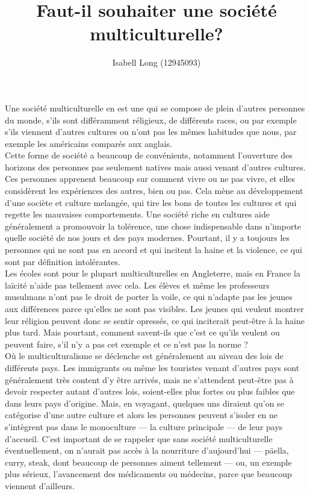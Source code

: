 \documentclass[12pt,a4paper]{article}
\begin{document}
\title{Faut-il souhaiter une société multiculturelle?}
\author{Isabell Long (12945093)}
\maketitle

Une société multiculturelle en est une qui se compose de plein
d'autres personnes du monde, s'ils sont différamment réligieux, de
différents races, ou par exemple s'ils viennent d'autres cultures ou
n'ont pas les mêmes habitudes que nous, par exemple les américains
comparés aux anglais.\\

Cette forme de société a beaucoup de convénients, notamment
l'ouverture des horizons des personnes pas seulement natives mais
aussi venant d'autres cultures. Ces personnes apprenent beaucoup sur
comment vivre ou ne pas vivre, et elles considèrent les expériences
des autres, bien ou pas. Cela mène au développement d'une sociète et
culture melangée, qui tire les bons de toutes les cultures et qui
regette les mauvaises comportements. Une société riche en cultures
aide généralement a promouvoir la tolérence, une chose indispensable
dans n'importe quelle société de nos jours et des pays modernes.
Pourtant, il y a toujours les personnes qui ne sont pas en accord et
qui incitent la haine et la violence, ce qui sont par définition
intolérantes.\\

Les écoles sont pour le plupart multiculturelles en Angleterre, mais
en France la laïcité n'aide pas tellement avec cela. Les élèves et
même les professeurs musulmans n'ont pas le droit de porter la voile,
ce qui n'adapte pas les jeunes aux différences parce qu'elles ne sont
pas visibles. Les jeunes qui veulent montrer leur réligion peuvent
donc se sentir opressés, ce qui inciterait peut-être à la haine plus
tard. Mais pourtant, comment savent-ils que c'est ce qu'ils veulent ou
peuvent faire, s'il n'y a pas cet exemple et ce n'est pas la norme ?\\

Où le multiculturalisme se déclenche est généralement au niveau des lois de différents pays. Les immigrants ou même les touristes venant d'autres pays sont généralement très content d'y être arrivés, mais ne s'attendent peut-être pas à devoir respecter autant d'autres lois, soient-elles plus fortes ou plus faibles que dans leurs pays d'origine. Mais, en voyagant, quelques uns diraient qu'on se catégorise d'une autre culture et alors les personnes peuvent s'isoler en ne s'intègrent pas dans le monoculture --- la culture principale --- de leur pays d'accueil. C'est important de se rappeler que sans société multiculturelle éventuellement, on n'aurait pas accès à la nourriture d'aujourd'hui --- päella, curry, steak, dont beaucoup de personnes aiment tellement --- ou, un exemple plus sérieux, l'avancement des médicaments ou médecins, parce que beaucoup viennent d'ailleurs.\\
\end{document}
